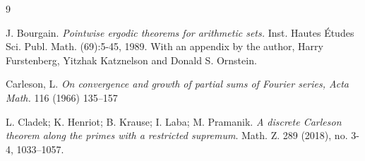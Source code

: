 \documentclass[12pt]{amsart}
\numberwithin{equation}{section}
\theoremstyle{definition}
\begin{document}
\begin{thebibliography}{9}

J. Bourgain. 
\emph{ Pointwise ergodic theorems for arithmetic sets. }
Inst. Hautes \'{E}tudes Sci. Publ. Math. (69):5-45, 1989.
With an appendix by the author, Harry Furstenberg, Yitzhak Katznelson and Donald S. Ornstein.







Carleson,  L.
\emph{On  convergence  and  growth  of  partial  sums  of  Fourier  series,  Acta  Math.}  116  (1966)  135–157


L. Cladek; K. Henriot; B. Krause; I. Laba; M. Pramanik.
\emph{A discrete Carleson theorem along the primes with a restricted supremum}.
Math. Z. 289 (2018), no. 3-4, 1033–1057.






\end{thebibliography}
\end{document}

